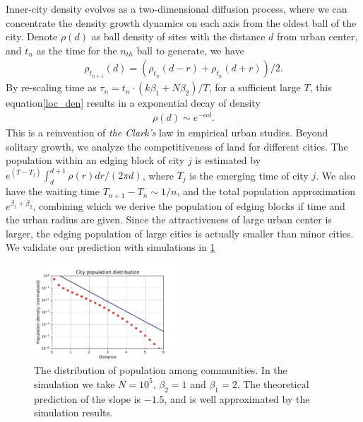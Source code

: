 \documentclass[reprint,unsortedaddress,amsmath,amssymb,floatfix,aps,prl,showkeys]{revtex4-2}
\begin{document}

Inner-city density evolves as a two-dimensional diffusion process, where we can concentrate the density growth dynamics on each axis from the oldest ball of the city. Denote $\rho(d)$ as ball density of sites with the distance $d$ from urban center, and $t_n$ as the time for the $n_{th}$ ball to generate, we have \begin{align}\rho_{t_{n+1}}(d) = (\rho_{t_{n}}(d-r) + \rho_{t_{n}}(d+r) )/2.\label{loc_den}\end{align} By re-scaling time as $\tau_n = t_n\cdot (k\beta_1+N\beta_2)/T$, for a sufficient large $T$, this equation\@s\ref{loc_den} results in a exponential decay of density
    \begin{align}
        \rho(d)\sim e^{-\alpha d}\label{clark_eq}.
    \end{align}
This is a reinvention of \emph{the Clark's} law in empirical urban studies\cite{clark1951urban}. Beyond solitary growth, we analyze the competitiveness of land for different cities. The population within an edging block of city $j$ is estimated by $e^{(T-T_j)}\int_{d}^{d+1}\rho(r)dr/(2\pi d)$, where $T_j$ is the emerging time of city $j$. We also have the waiting time $T_{n+1}-T_{n}\sim 1/n$, and the total population approximation $e^{\beta_1+\beta_2}$, combining which we derive the population of edging blocks if time and the urban radius are given. Since the attractiveness of large urban center is larger, the edging population of large cities is actually smaller than minor cities. We validate our prediction with simulations in \ref{fig:clark} %

\begin{figure}
    \centering
    \includegraphics[width=0.48\textwidth]{pics/kernal_density.pdf}
    \caption{The distribution of population among communities. In the simulation we take $N = 10^5$, $\beta_2=1$ and $\beta_1 = 2$. The theoretical prediction of the slope is $-1.5$, and is well approximated by the simulation results.}
    \label{fig:clark}
\end{figure}
\end{document}

